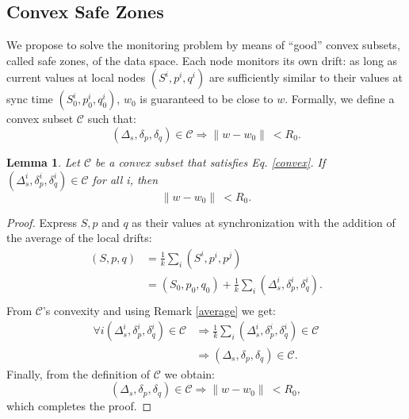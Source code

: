 \documentclass[11pt,twocolumn,varwidth=true,a4paper,fleqn]{article}
\newtheorem{lemma}{Lemma}
\begin{document}
\subsection{Convex Safe Zones}
We propose to solve the monitoring problem by means of
``good'' convex subsets, called safe zones, of the data space.
Each node monitors its own drift: as long as current values
at local nodes $(S^i,p^i,q^i)$ are sufficiently similar to their values
at sync time $(S^i_0,p^i_0,q^i_0)$, $w_0$ is guaranteed to be close to $w$.
Formally, we define a convex subset $\mathcal{C}$ such that:
\begin{equation} \label{convex}
(\Delta_s, \delta_p, \delta_q) \in \mathcal{C} \Rightarrow \parallel w-w_0
\parallel \ < R_0.
\end{equation}
\begin{lemma}
Let $\mathcal{C}$ be a convex subset that satisfies Eq. \ref{convex}.
If $(\Delta_s^i, \delta_p^i, \delta_q^i) \in \mathcal{C}$ for all i, then
\begin{equation*}
\parallel w-w_0 \parallel \ < R_0.
\end{equation*}
\end{lemma}
\begin{proof}
Express $S, p$ and $q$ as their values at synchronization with the addition of the
average of the local drifts:
\begin{equation*} 
\begin{split}
(S,p,q) & = \frac{1}{k} \sum_i (S^i,p^i,p^j) \\
 & = (S_0,p_0,q_0) + \frac{1}{k} \sum_i (\Delta_s^i,\delta^i_p,\delta_q^i). \\
\end{split}
\end{equation*}
From $\mathcal{C}$'s convexity and using Remark \ref{average} we get:
\begin{equation*} 
\begin{split}
\forall i (\Delta_s^i,\delta^i_p,\delta_q^i) \in \mathcal{C} & \Rightarrow 
\frac{1}{k} \sum_i (\Delta_s^i,\delta^i_p,\delta_q^i) \in \mathcal{C} \\
& \Rightarrow (\Delta_s,\delta_p,\delta_q) \in \mathcal{C}.
\end{split}
\end{equation*}
Finally, from the definition of $\mathcal{C}$ we obtain:
\begin{equation*}
(\Delta_s,\delta_p,\delta_q) \in \mathcal{C} \Rightarrow \parallel w-w_0
\parallel \ < R_0,
\end{equation*}
which completes the proof.
\end{proof}
\end{document}
